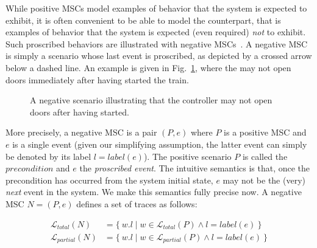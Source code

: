 While positive MSCs model examples of behavior that the system is expected to exhibit, it is often convenient to be able to model the counterpart, that is examples of behavior that the system is expected (even required) \emph{not} to exhibit. Such proscribed behaviors are illustrated with negative MSCs~\cite{Uchitel:2004}. A negative MSC is simply a scenario whose last event is proscribed, as depicted by a crossed arrow below a dashed line. An example is given in Fig.~\ref{image:train-negative-scenario}, where the  may not open doors immediately after having started the train.

\begin{figure}[H]\centering
{}
\caption{A negative scenario illustrating that the controller may not open doors after having started.\label{image:train-negative-scenario}}
\end{figure}

More precisely, a negative MSC is a pair $(P,e)$ where $P$ is a positive MSC and $e$ is a single event (given our simplifying assumption, the latter event can simply be denoted by its label $l = label(e)$). The positive scenario $P$ is called the $precondition$ and $e$ the \emph{proscribed event}. The intuitive semantics is that, once the precondition has occurred from the system initial state, $e$ may not be the (very) \emph{next} event in the system. We make this semantics fully precise now. A negative MSC $N = (P,e)$ defines a set of traces as follows:

\begin{align*}
\mathcal{L}_{total}(N)   &= \{~w.l \mid w \in \mathcal{L}_{total}(P) \wedge l = label(e)~\} \\
\mathcal{L}_{partial}(N) &= \{~w.l \mid w \in \mathcal{L}_{partial}(P) \wedge l = label(e)~\}
\end{align*}

